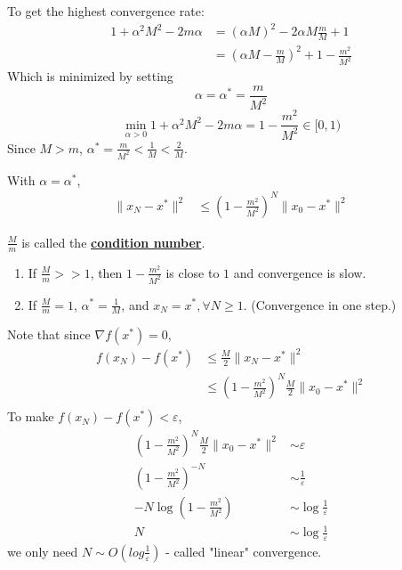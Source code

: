 \documentclass[11pt]{elegantbook}
\begin{document}
To get the highest convergence rate:
\begin{equation}
    \begin{aligned}
        1+\alpha^2M^2-2m\alpha&=(\alpha M)^2-2\alpha M\frac{m}{M}+1\\
        &=(\alpha M-\frac{m}{M})^2+1-\frac{m^2}{M^2}
    \end{aligned}
    \nonumber
\end{equation}
Which is minimized by setting $$\alpha=\alpha^*=\frac{m}{M^2}$$
$$\min_{\alpha>0}1+\alpha^2M^2-2m\alpha=1-\frac{m^2}{M^2}\in[0,1)$$
Since $M>m$, $\alpha^*=\frac{m}{M^2}<\frac{1}{M}<\frac{2}{M}$.

With $\alpha=\alpha^*$,
\begin{equation}
    \begin{aligned}
        \|x_{N}-x^*\|^2&\leq (1-\frac{m^2}{M^2})^N\|x_0-x^*\|^2
    \end{aligned}
    \nonumber
\end{equation}

$\frac{M}{m}$ is called the \textbf{\underline{condition number}}.
\begin{enumerate}[$\bullet$]
    \item If $\frac{M}{m}>>1$, then $1-\frac{m^2}{M^2}$ is close to $1$ and convergence is slow.
    \item If $\frac{M}{m}=1$, $\alpha^*=\frac{1}{M}$, and $x_N=x^*,\forall N\geq 1$. (Convergence in one step.)
\end{enumerate}
Note that since $\nabla f(x^*)=0$,
\begin{equation}
    \begin{aligned}
        f(x_N)-f(x^*)&\leq \frac{M}{2}\|x_N-x^*\|^2\\
        &\leq (1-\frac{m^2}{M^2})^N\frac{M}{2}\|x_0-x^*\|^2\\
    \end{aligned}
    \nonumber
\end{equation}
To make $f(x_N)-f(x^*)<\varepsilon$,
\begin{equation}
    \begin{aligned}
        (1-\frac{m^2}{M^2})^N\frac{M}{2}\|x_0-x^*\|^2&\sim \varepsilon\\
        (1-\frac{m^2}{M^2})^{-N}&\sim \frac{1}{\varepsilon}\\
        -N\log(1-\frac{m^2}{M^2})&\sim\log\frac{1}{\varepsilon}\\
        N&\sim \log\frac{1}{\varepsilon}
    \end{aligned}
    \nonumber
\end{equation}
we only need $N\sim O(log\frac{1}{\varepsilon})$ - called "linear" convergence.
\end{document}
